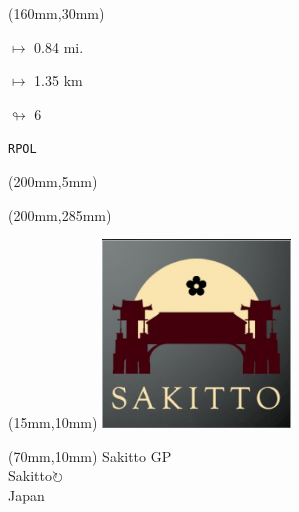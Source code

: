 \begin{textblock*}{40mm}(160mm,30mm)%
\Large
\par$\mapsto$ 0.84 mi.
\par$\mapsto$ 1.35 km
\par$\looparrowright$ 6
\par\hfill\tiny\tt RPOL\\
\end{textblock*}
\begin{textblock*}{20mm}(200mm,5mm)%
\fbox{\thepage}
\label{RPOL}
\end{textblock*}
\begin{textblock*}{20mm}(200mm,285mm)%
\fbox{\thepage}
\end{textblock*}

\null\newpage
\begin{textblock*}{50mm}(15mm,10mm)%
\includegraphics[width=50mm]{LG/2015-05-20_00093.png}
\end{textblock*}
\begin{textblock*}{130mm}(70mm,10mm)%
{\fontsize{20}{20}\selectfont Sakitto GP\\}
{\fontsize{16}{16}\selectfont Sakitto\hfill \Large$\circlearrowright$\\}
{\fontsize{12}{12}\selectfont Japan\\}
\end{textblock*}
